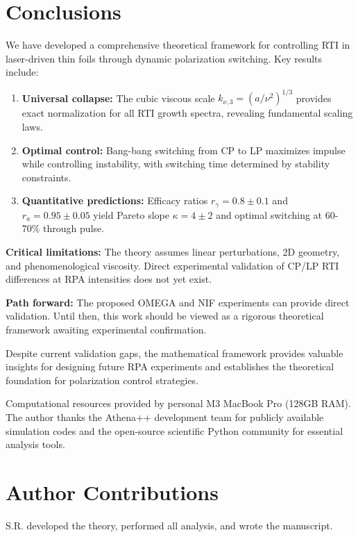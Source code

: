 \documentclass[aps,pre,twocolumn,showpacs,superscriptaddress]{revtex4-2}
\theoremstyle{definition}
\begin{document}
\section{Conclusions}\label{sec:conclusions}

We have developed a comprehensive theoretical framework for controlling RTI in laser-driven thin foils through dynamic polarization switching. Key results include:

\begin{enumerate}
\item \textbf{Universal collapse:} The cubic viscous scale $k_{\nu,3} = (a/\nu^2)^{1/3}$ provides exact normalization for all RTI growth spectra, revealing fundamental scaling laws.

\item \textbf{Optimal control:} Bang-bang switching from CP to LP maximizes impulse while controlling instability, with switching time determined by stability constraints.

\item \textbf{Quantitative predictions:} Efficacy ratios $r_\gamma = 0.8 \pm 0.1$ and $r_a = 0.95 \pm 0.05$ yield Pareto slope $\kappa = 4 \pm 2$ and optimal switching at 60-70\% through pulse.
\end{enumerate}

\textbf{Critical limitations:} The theory assumes linear perturbations, 2D geometry, and phenomenological viscosity. Direct experimental validation of CP/LP RTI differences at RPA intensities does not yet exist.

\textbf{Path forward:} The proposed OMEGA and NIF experiments can provide direct validation. Until then, this work should be viewed as a rigorous theoretical framework awaiting experimental confirmation.

Despite current validation gaps, the mathematical framework provides valuable insights for designing future RPA experiments and establishes the theoretical foundation for polarization control strategies.

\begin{acknowledgments}
Computational resources provided by personal M3 MacBook Pro (128GB RAM). The author thanks the Athena++ development team for publicly available simulation codes and the open-source scientific Python community for essential analysis tools.
\end{acknowledgments}

\section*{Author Contributions}
S.R. developed the theory, performed all analysis, and wrote the manuscript.
\end{document}
